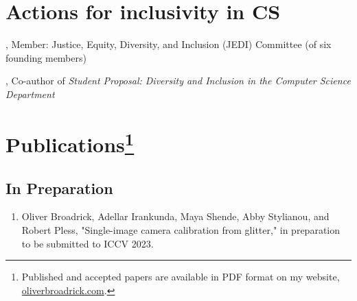 \documentclass[letterpaper]{article}
\renewenvironment{itemize}{
  \begin{list}{}{
    \setlength{\leftmargin}{1.5em}
  }
}{
  \end{list}
}
\begin{document}

\section*{Actions for inclusivity in CS}
, Member: Justice, Equity, Diversity, and Inclusion (JEDI) Committee (of six founding members)

, Co-author of \emph{Student Proposal: Diversity and Inclusion in the Computer Science Department} 

\section*{Publications\footnote{Published and accepted papers are available in PDF format on my website, \href{https://www.oliverbroadrick.com}{oliverbroadrick.com}.}}

\subsection*{In Preparation}
\begin{enumerate}
\item
Oliver Broadrick, Adellar Irankunda, Maya Shende, Abby Stylianou, and Robert Pless, "Single-image camera calibration from glitter," in preparation to be submitted to ICCV 2023.
\end{enumerate}
\end{document}
